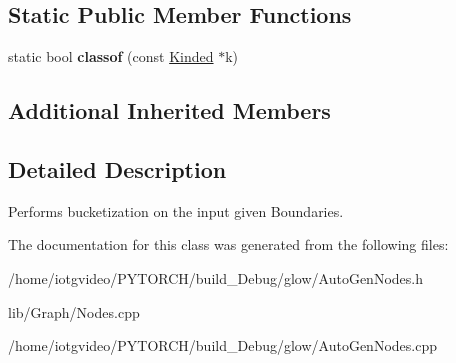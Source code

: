 \subsection*{Static Public Member Functions}
\begin{DoxyCompactItemize}
\item 
\mbox{\label{classglow_1_1_bucketize_node_a625e8fd29b402dfec7e0dbed0818882e}} 
static bool {\bfseries classof} (const \hyperlink{classglow_1_1_kinded}{Kinded} $\ast$k)
\end{DoxyCompactItemize}
\subsection*{Additional Inherited Members}


\subsection{Detailed Description}
Performs bucketization on the input given Boundaries. 

The documentation for this class was generated from the following files\+:\begin{DoxyCompactItemize}
\item 
/home/iotgvideo/\+P\+Y\+T\+O\+R\+C\+H/build\+\_\+\+Debug/glow/Auto\+Gen\+Nodes.\+h\item 
lib/\+Graph/Nodes.\+cpp\item 
/home/iotgvideo/\+P\+Y\+T\+O\+R\+C\+H/build\+\_\+\+Debug/glow/Auto\+Gen\+Nodes.\+cpp\end{DoxyCompactItemize}
